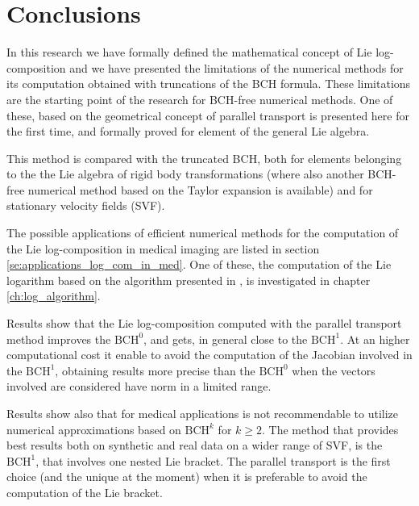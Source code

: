 
\chapter{Conclusions}\label{ch:conclusions}

In this research we have formally defined the mathematical concept of Lie log-composition and we have presented the limitations of the numerical methods for its computation obtained with truncations of the BCH formula. These limitations are the starting point of the research for BCH-free numerical methods. 
One of these, based on the geometrical concept of parallel transport is presented here for the first time, and formally proved for element of the general Lie algebra.

This method is compared with the truncated BCH, both for elements belonging to the the Lie algebra of rigid body transformations (where also another BCH-free numerical method based on the Taylor expansion is available) and for stationary velocity fields (SVF).

The possible applications of efficient numerical methods for the computation of the Lie log-composition in medical imaging are listed in section \ref{se:applications_log_com_in_med}. One of these, the computation of the Lie logarithm based on the algorithm presented in \cite{bossa2008new}, is investigated in chapter \ref{ch:log_algorithm}.

Results show that the Lie log-composition computed with the parallel transport method improves the $\text{BCH}^0$, and gets, in general close to the $\text{BCH}^1$. At an higher computational cost it enable to avoid the computation of the Jacobian involved in the $\text{BCH}^1$, obtaining results more precise than the $\text{BCH}^0$ when the vectors involved are considered have norm in a limited range.

Results show also that for medical applications is not recommendable to utilize numerical approximations based on $\text{BCH}^k$ for $k\geq 2$. The method that provides best results both on synthetic and real data on a wider range of SVF, is the $\text{BCH}^1$, that involves one nested Lie bracket. The parallel transport is the first choice (and the unique at the moment) when it is preferable to avoid the computation of the Lie bracket. 


